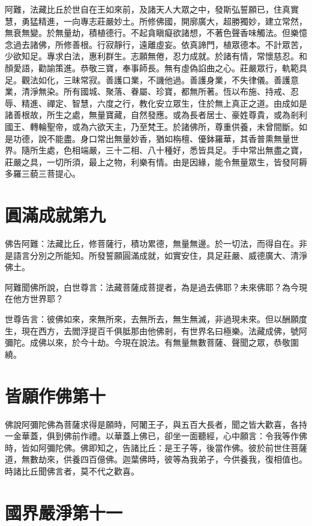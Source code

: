 \documentclass{zhvt-classic}
\begin{document}
阿難，法藏比丘於世自在王如來前，及諸天人大眾之中，發斯弘誓願已，住真實慧，勇猛精進，一向專志莊嚴妙土。所修佛國，開廓廣大，超勝獨妙，建立常然，無衰無變。於無量劫，積植德行。不起貪瞋癡欲諸想，不著色聲香味觸法。但樂憶念過去諸佛，所修善根。行寂靜行，遠離虛妄。依真諦門，植眾德本。不計眾苦，少欲知足。專求白法，惠利群生。志願無倦，忍力成就。於諸有情，常懷慈忍。和顏愛語，勸諭策進。恭敬三寶，奉事師長。無有虛偽諂曲之心。莊嚴眾行，軌範具足。觀法如化，三昧常寂。善護口業，不譏他過。善護身業，不失律儀。善護意業，清淨無染。所有國城、聚落、眷屬、珍寶，都無所著。恆以布施、持戒、忍辱、精進、禪定、智慧，六度之行，教化安立眾生，住於無上真正之道。由成如是諸善根故，所生之處，無量寶藏，自然發應。或為長者居士、豪姓尊貴，或為剎利國王、轉輪聖帝，或為六欲天主，乃至梵王。於諸佛所，尊重供養，未曾間斷。如是功德，說不能盡。身口常出無量妙香，猶如栴檀、優鉢羅華，其香普熏無量世界。隨所生處，色相端嚴，三十二相、八十種好，悉皆具足。手中常出無盡之寶，莊嚴之具，一切所須，最上之物，利樂有情。由是因緣，能令無量眾生，皆發阿耨多羅三藐三菩提心。

\chapter*{圓滿成就第九}

佛告阿難：法藏比丘，修菩薩行，積功累德，無量無邊。於一切法，而得自在。非是語言分別之所能知。所發誓願圓滿成就，如實安住，具足莊嚴、威德廣大、清淨佛土。

阿難聞佛所說，白世尊言：法藏菩薩成菩提者，為是過去佛耶？未來佛耶？為今現在他方世界耶？

世尊告言：彼佛如來，來無所來，去無所去，無生無滅，非過現未來。但以酬願度生，現在西方，去閻浮提百千俱胝那由他佛剎，有世界名曰極樂。法藏成佛，號阿彌陀。成佛以來，於今十劫。今現在說法。有無量無數菩薩、聲聞之眾，恭敬圍繞。

\chapter*{皆願作佛第十}

佛說阿彌陀佛為菩薩求得是願時，阿闍王子，與五百大長者，聞之皆大歡喜，各持一金華蓋，俱到佛前作禮。以華蓋上佛已，卻坐一面聽經，心中願言：令我等作佛時，皆如阿彌陀佛。佛即知之，告諸比丘：是王子等，後當作佛。彼於前世住菩薩道，無數劫來，供養四百億佛。迦葉佛時，彼等為我弟子，今供養我，復相值也。時諸比丘聞佛言者，莫不代之歡喜。

\chapter*{國界嚴淨第十一}
\end{document}

